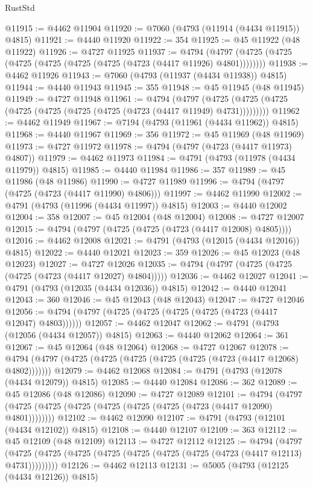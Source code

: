 \begin{lexlean}{RustStd}
\begin{coremodule}
@11915 := @4462 @11904
@11920 := @7060 (@4793 (@11914 (@4434 @11915)) @4815)
@11921 := @4440 @11920
@11922 := 354
@11925 := @45 @11922 (@48 @11922)
@11926 := @4727 @11925
@11937 := @4794 (@4797 (@4725 (@4725 (@4725 (@4725 (@4725 (@4725 (@4723 (@4417 @11926) @4801))))))))
@11938 := @4462 @11926
@11943 := @7060 (@4793 (@11937 (@4434 @11938)) @4815)
@11944 := @4440 @11943
@11945 := 355
@11948 := @45 @11945 (@48 @11945)
@11949 := @4727 @11948
@11961 := @4794
    (@4797 (@4725 (@4725 (@4725 (@4725 (@4725 (@4725 (@4725 (@4723 (@4417 @11949) @4731)))))))))
@11962 := @4462 @11949
@11967 := @7194 (@4793 (@11961 (@4434 @11962)) @4815)
@11968 := @4440 @11967
@11969 := 356
@11972 := @45 @11969 (@48 @11969)
@11973 := @4727 @11972
@11978 := @4794 (@4797 (@4723 (@4417 @11973) @4807))
@11979 := @4462 @11973
@11984 := @4791 (@4793 (@11978 (@4434 @11979)) @4815)
@11985 := @4440 @11984
@11986 := 357
@11989 := @45 @11986 (@48 @11986)
@11990 := @4727 @11989
@11996 := @4794 (@4797 (@4725 (@4723 (@4417 @11990) @4806)))
@11997 := @4462 @11990
@12002 := @4791 (@4793 (@11996 (@4434 @11997)) @4815)
@12003 := @4440 @12002
@12004 := 358
@12007 := @45 @12004 (@48 @12004)
@12008 := @4727 @12007
@12015 := @4794 (@4797 (@4725 (@4725 (@4723 (@4417 @12008) @4805))))
@12016 := @4462 @12008
@12021 := @4791 (@4793 (@12015 (@4434 @12016)) @4815)
@12022 := @4440 @12021
@12023 := 359
@12026 := @45 @12023 (@48 @12023)
@12027 := @4727 @12026
@12035 := @4794 (@4797 (@4725 (@4725 (@4725 (@4723 (@4417 @12027) @4804)))))
@12036 := @4462 @12027
@12041 := @4791 (@4793 (@12035 (@4434 @12036)) @4815)
@12042 := @4440 @12041
@12043 := 360
@12046 := @45 @12043 (@48 @12043)
@12047 := @4727 @12046
@12056 := @4794 (@4797 (@4725 (@4725 (@4725 (@4725 (@4723 (@4417 @12047) @4803))))))
@12057 := @4462 @12047
@12062 := @4791 (@4793 (@12056 (@4434 @12057)) @4815)
@12063 := @4440 @12062
@12064 := 361
@12067 := @45 @12064 (@48 @12064)
@12068 := @4727 @12067
@12078 := @4794 (@4797 (@4725 (@4725 (@4725 (@4725 (@4725 (@4723 (@4417 @12068) @4802)))))))
@12079 := @4462 @12068
@12084 := @4791 (@4793 (@12078 (@4434 @12079)) @4815)
@12085 := @4440 @12084
@12086 := 362
@12089 := @45 @12086 (@48 @12086)
@12090 := @4727 @12089
@12101 := @4794 (@4797 (@4725 (@4725 (@4725 (@4725 (@4725 (@4725 (@4723 (@4417 @12090) @4801))))))))
@12102 := @4462 @12090
@12107 := @4791 (@4793 (@12101 (@4434 @12102)) @4815)
@12108 := @4440 @12107
@12109 := 363
@12112 := @45 @12109 (@48 @12109)
@12113 := @4727 @12112
@12125 := @4794
    (@4797 (@4725 (@4725 (@4725 (@4725 (@4725 (@4725 (@4725 (@4723 (@4417 @12113) @4731)))))))))
@12126 := @4462 @12113
@12131 := @5005 (@4793 (@12125 (@4434 @12126)) @4815)

\end{coremodule}
\end{lexlean}
